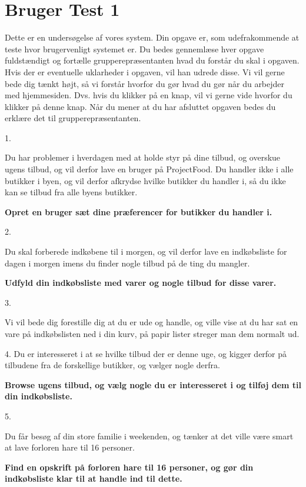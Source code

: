 \chapter{Bruger Test 1}\label{b:brugertest1}

Dette er en undersøgelse af vores system. Din opgave er, som udefrakommende at teste hvor brugervenligt systemet er. Du bedes gennemlæse hver opgave fuldstændigt og fortælle grupperepræsentanten hvad du forstår du skal i opgaven. Hvis der er eventuelle uklarheder i opgaven, vil han udrede disse. Vi vil gerne bede dig tænkt højt, så vi forstår hvorfor du gør hvad du gør når du arbejder med hjemmesiden. Dvs. hvis du klikker på en knap, vil vi gerne vide hvorfor du klikker på denne knap. Når du mener at du har afsluttet opgaven bedes du erklære det til grupperepræsentanten.

1.

Du har problemer i hverdagen med at holde styr på dine tilbud, og overskue ugens tilbud, og vil derfor lave en bruger på ProjectFood.
Du handler ikke i alle butikker i byen, og vil derfor afkrydse hvilke butikker du handler i, så du ikke kan se tilbud fra alle byens butikker.

\textbf{Opret en bruger sæt dine præferencer for butikker du handler i. }

2.

Du skal forberede indkøbene til i morgen, og vil derfor lave en indkøbsliste for dagen i morgen imens du finder nogle tilbud på de ting du mangler.

\textbf{Udfyld din indkøbsliste med varer og nogle tilbud for disse varer.}

3.

Vi vil bede dig forestille dig at du er ude og handle, og ville vise at du har sat en vare på indkøbslisten ned i din kurv, på papir lister streger man dem normalt ud.

4.
Du er interesseret i at se hvilke tilbud der er denne uge, og kigger derfor på tilbudene fra de forskellige butikker, og vælger nogle derfra.

\textbf{Browse ugens tilbud, og vælg nogle du er interesseret i og tilføj dem til din indkøbsliste.}

5.

Du får besøg af din store familie i weekenden, og tænker at det ville være smart at lave forloren hare til 16 personer.

\textbf{Find en opskrift på forloren hare til 16 personer, og gør din indkøbsliste klar til at handle ind til dette.}

